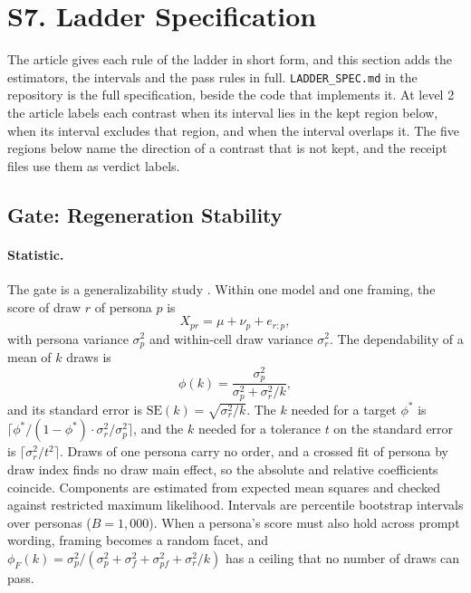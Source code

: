 \section{S7. Ladder Specification}
\label{sec:s7}

The article gives each rule of the ladder in short form, and this section adds the estimators, the intervals and the pass rules in full. \texttt{LADDER\_SPEC.md} in the repository is the full specification, beside the code that implements it. At level 2 the article labels each contrast  when its interval lies in the kept region below,  when its interval excludes that region, and  when the interval overlaps it. The five regions below name the direction of a contrast that is not kept, and the receipt files use them as verdict labels.

\subsection*{Gate: Regeneration Stability}
\label{sec:s7-gate}

\paragraph{Statistic.}
The gate is a generalizability study \citep{cronbach1972dependability,brennan2001gtheory}.
Within one model and one framing, the score of draw $r$ of persona $p$ is
\begin{equation}
X_{pr} = \mu + \nu_p + e_{r:p},
\end{equation}
with persona variance $\sigma^2_p$ and within-cell draw variance $\sigma^2_r$.
The dependability of a mean of $k$ draws is
\begin{equation}
\phi(k) = \frac{\sigma^2_p}{\sigma^2_p + \sigma^2_r / k},
\label{eq:phi}
\end{equation}
and its standard error is $\mathrm{SE}(k) = \sqrt{\sigma^2_r / k}$.
The $k$ needed for a target $\phi^*$ is $\lceil \phi^*/(1-\phi^*) \cdot \sigma^2_r/\sigma^2_p \rceil$, and the $k$ needed for a tolerance $t$ on the standard error is $\lceil \sigma^2_r / t^2 \rceil$.
Draws of one persona carry no order, and a crossed fit of persona by draw index finds no draw main effect, so the absolute and relative coefficients coincide. %
Components are estimated from expected mean squares and checked against restricted maximum likelihood. %
Intervals are percentile bootstrap intervals over personas ($B = 1{,}000$).
When a persona's score must also hold across prompt wording, framing becomes a random facet, and $\phi_F(k) = \sigma^2_p / (\sigma^2_p + \sigma^2_f + \sigma^2_{pf} + \sigma^2_r/k)$ has a ceiling that no number of draws can pass.

